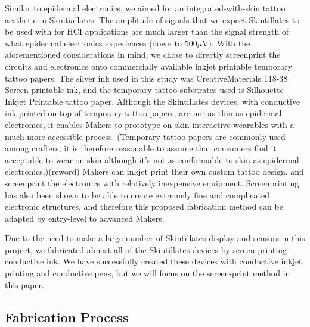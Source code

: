 \documentclass{sigchi}
\begin{document}
Similar to epidermal electronics, we aimed for an integrated-with-skin tattoo aesthetic in Skintiallates. The amplitude of signals that we expect Skintillates to be used with for HCI applications are much larger than the signal strength of what epidermal electronics experiences (down to 500$\mu$V). 
With the aforementioned considerations in mind, we chose to directly screenprint the circuits and electronics onto commercially available inkjet printable temporary tattoo papers. The silver ink used in this study was CreativeMaterials 118-38 Screen-printable ink, and the temporary tattoo substrates used is Silhouette Inkjet Printable tattoo paper. Although the Skintillates devices, with conductive ink printed on top of temporary tattoo papers, are not as thin as epidermal electronics, it enables Makers to prototype on-skin interactive wearables with a much more accessible process. (Temporary tattoo papers are commonly used among crafters, it is therefore reasonable to assume that consumers find it acceptable to wear on skin although it’s not as conformable to skin as epidermal electronics.)(reword) Makers can inkjet print their own custom tattoo design, and screenprint the electronics with relatively inexpensive equipment. Screenprinting has also been shown to be able to create extremely fine and complicated electronic structures, and therefore this proposed fabrication method can be adapted by entry-level to advanced Makers. %

Due to the need to make a large number of Skintillates display and sensors in this project, we fabricated almost all of the Skintillates devices by screen-printing conductive ink. We have successfully created these devices with %
conductive inkjet printing and conductive pens, but we will focus on the screen-print method in this paper. 

\subsection{Fabrication Process}
\end{document}
